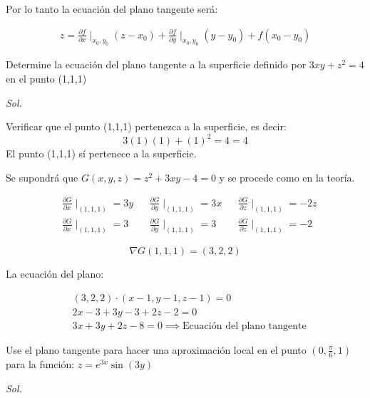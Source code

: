 Por lo tanto la ecuación del plano tangente será:

\begin{align*}
	z=\frac{\partial f}{\partial x}\mid_{x_0,y_0}\left(z-x_0\right)+\frac{\partial f}{\partial y}\mid_{x_0,y_0}\left(y-y_0\right)+f\left(x_0-y_0\right)
\end{align*}

\begin{example}
	Determine la ecuación del plano tangente a la superficie definido por $3xy+z^2=4$
	en el punto (1,1,1)
\end{example}

\textit{ Sol. }

Verificar que el punto (1,1,1) pertenezca a la superficie, es decir:
\begin{equation*}
	3(1)(1)+(1)^2=4=4
\end{equation*}
El punto (1,1,1) sí pertenece a la superficie.

Se supondrá que $G(x,y,z)=z^2+3xy-4=0$ y se procede como en la teoría.

\begin{align*}
	 & \frac{\partial G}{\partial x}\mid_{(1,1,1)}=3y &  & \frac{\partial G}{\partial y}\mid_{(1,1,1)}=3x &  & \frac{\partial G}{\partial z}\mid_{(1,1,1)}=-2z \\
	 & \frac{\partial G}{\partial x}\mid_{(1,1,1)}=3  &  & \frac{\partial G}{\partial y}\mid_{(1,1,1)}=3  &  & \frac{\partial G}{\partial z}\mid_{(1,1,1)}=-2
\end{align*}


\begin{equation*}
	\nabla G(1,1,1)=(3,2,2)
\end{equation*}

La ecuación del plano:

\begin{align*}
	 & (3,2,2)\cdot (x-1,y-1,z-1)=0                            \\
	 & 2x-3+3y-3+2z-2=0                                        \\
	 & 3x+3y+2z-8=0\implies \text{Ecuación del plano tangente}
\end{align*}

\begin{example}
	Use el plano tangente para hacer una aproximación local en el punto $(0,\frac{\pi}{6},1)$ para la función: $z=e^{3x}\sin{(3y)}$
\end{example}

\textit{ Sol. }

